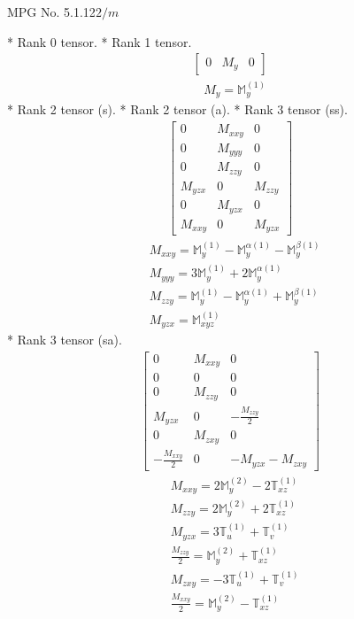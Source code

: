 \documentclass[fleqn,8pt,landscape]{jsarticle}
\begin{document}
\setcounter{MaxMatrixCols}{32}

\renewcommand{\tablename}{Table~}
\renewcommand{\figurename}{Figure~}
\begin{center}
\LARGE
MPG No. 5.1.12\quad$2/m$
\end{center}
* Rank 0 tensor.
* Rank 1 tensor.
\begin{align*}
\begin{bmatrix} 0 & M_{y} & 0 \end{bmatrix}
\end{align*}
\begin{align*}
& M_{y} = \mathbb{M}_{y}^{(1)}
\end{align*}
* Rank 2 tensor (s).
* Rank 2 tensor (a).
* Rank 3 tensor (ss).
\begin{align*}
\begin{bmatrix} 0 & M_{xxy} & 0 \\ 0 & M_{yyy} & 0 \\ 0 & M_{zzy} & 0 \\ M_{yzx} & 0 & M_{zzy} \\ 0 & M_{yzx} & 0 \\ M_{xxy} & 0 & M_{yzx} \end{bmatrix}
\end{align*}
\begin{align*}
& M_{xxy} = \mathbb{M}_{y}^{(1)} - \mathbb{M}_{y}^{\alpha(1)} - \mathbb{M}_{y}^{\beta(1)} \\
& M_{yyy} = 3 \mathbb{M}_{y}^{(1)} + 2 \mathbb{M}_{y}^{\alpha(1)} \\
& M_{zzy} = \mathbb{M}_{y}^{(1)} - \mathbb{M}_{y}^{\alpha(1)} + \mathbb{M}_{y}^{\beta(1)} \\
& M_{yzx} = \mathbb{M}_{xyz}^{(1)}
\end{align*}
* Rank 3 tensor (sa).
\begin{align*}
\begin{bmatrix} 0 & M_{xxy} & 0 \\ 0 & 0 & 0 \\ 0 & M_{zzy} & 0 \\ M_{yzx} & 0 & - \frac{M_{zzy}}{2} \\ 0 & M_{zxy} & 0 \\ - \frac{M_{xxy}}{2} & 0 & - M_{yzx} - M_{zxy} \end{bmatrix}
\end{align*}
\begin{align*}
& M_{xxy} = 2 \mathbb{M}_{y}^{(2)} - 2 \mathbb{T}_{xz}^{(1)} \\
& M_{zzy} = 2 \mathbb{M}_{y}^{(2)} + 2 \mathbb{T}_{xz}^{(1)} \\
& M_{yzx} = 3 \mathbb{T}_{u}^{(1)} + \mathbb{T}_{v}^{(1)} \\
& \frac{M_{zzy}}{2} = \mathbb{M}_{y}^{(2)} + \mathbb{T}_{xz}^{(1)} \\
& M_{zxy} = - 3 \mathbb{T}_{u}^{(1)} + \mathbb{T}_{v}^{(1)} \\
& \frac{M_{xxy}}{2} = \mathbb{M}_{y}^{(2)} - \mathbb{T}_{xz}^{(1)}
\end{align*}
\end{document}
